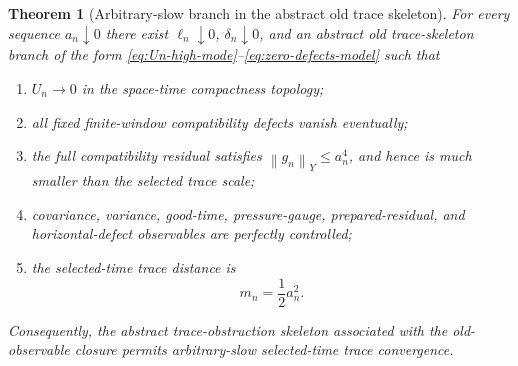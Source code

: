 \documentclass[11pt]{article}
\numberwithin{equation}{section}
\newtheorem{theorem}{Theorem}[section]
\newcommand{\norm}[2]{\left\|#1\right\|_{#2}}
\begin{document}
\begin{theorem}[Arbitrary-slow branch in the abstract old trace skeleton]\label{thm:arbitrary-slow-expanded}
For every sequence \(a_n\downarrow0\) there exist \(\ell_n\downarrow0\), \(\delta_n\downarrow0\), and an abstract old trace-skeleton branch of the form \eqref{eq:Un-high-mode}--\eqref{eq:zero-defects-model} such that
\begin{enumerate}[label=(\roman*)]
\item \(U_n\to0\) in the space-time compactness topology;
\item all fixed finite-window compatibility defects vanish eventually;
\item the full compatibility residual satisfies \(\norm{g_n}{Y}\le a_n^4\), and hence is much smaller than the selected trace scale;
\item covariance, variance, good-time, pressure-gauge, prepared-residual, and horizontal-defect observables are perfectly controlled;
\item the selected-time trace distance is
\begin{equation}\label{eq:mn-an-expanded}
m_n=\frac12a_n^2.
\end{equation}
\end{enumerate}
Consequently, the abstract trace-obstruction skeleton associated with the old-observable closure permits arbitrary-slow selected-time trace convergence.
\end{theorem}
\end{document}
